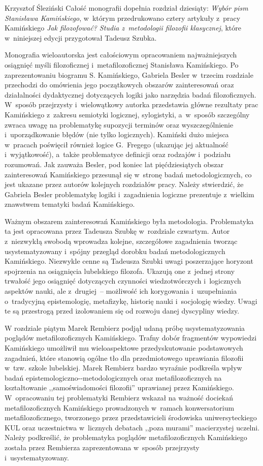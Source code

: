 \begin{recplenv}{Krzysztof Śleziński}
Całość monografii dopełnia rozdział dziesiąty: \textit{Wybór pism Stanisława Kamińskiego}, w~którym przedrukowano cztery
artykuły z~pracy Kamińskiego \textit{Jak filozofować? Studia z~metodologii filozofii klasycznej}, które w~niniejszej
edycji przygotował Tadeusz Szubka.

Monografia wieloautorska jest całościowym opracowaniem najważniejszych osiągnięć myśli filozoficznej i~metafilozoficznej
Stanisława Kamińskiego. Po zaprezentowaniu biogramu S. Kamińskiego, Gabriela Besler w~trzecim rozdziale przechodzi do
omówienia jego początkowych obszarów zainteresowań oraz działalności dydaktycznej dotyczących logiki jako narzędzia
badań filozoficznych. W~sposób przejrzysty i~wielowątkowy autorka przedstawia główne rezultaty prac
Kamińskiego z~zakresu semiotyki logicznej, sylogistyki, a~w~sposób szczególny zwraca uwagę na problematykę supozycji terminów oraz
wyszczególnienie i~uporządkowanie błędów (nie tylko logicznych). Kamiński dużo miejsca w~pracach poświęcił również
logice G.~Fregego (ukazując jej aktualność i~wyjątkowość), a~także problematyce definicji oraz rodzajów i~podziału
rozumowań. Jak zauważa Besler, pod koniec lat pięćdziesiątych obszar zainteresowań Kamińskiego przesunął się w~stronę
badań metodologicznych, co jest ukazane przez autorów kolejnych rozdziałów pracy. Należy stwierdzić, że Gabriela Besler
problematykę logiki i~zagadnienia logiczne prezentuje z~wielkim znawstwem tematyki badań Kamińskiego. 

Ważnym obszarem zainteresowań Kamińskiego była metodologia. Problematyka ta jest opracowana przez Tadeusza
Szubkę w~rozdziale czwartym. Autor z~niezwykłą swobodą wprowadza kolejne, szczegółowe zagadnienia tworząc
usystematyzowany i~spójny przegląd dorobku badań metodologicznych Kamińskiego. Niezwykle cenne są Tadeusza Szubki
uwagi poszerzające
horyzont spojrzenia na osiągnięcia lubelskiego filozofa. Ukazują one z~jednej strony trwałość jego osiągnięć
dotyczących czynności wiedzotwórczych i~logicznych aspektów nauki, ale z~drugiej~-- możliwość ich
korygowania i~uzupełniania o~tradycyjną epistemologię, metafizykę, historię nauki i~socjologię wiedzy.
Uwagi te są przestrogą przed
izolowaniem się od rozwoju danej dyscypliny wiedzy.

W rozdziale piątym Marek Rembierz podjął udaną próbę usystematyzowania poglądów metafilozoficznych Kamińskiego. Trafny
dobór fragmentów wypowiedzi Kamińskiego umożliwił mu wieloaspektowe przedyskutowanie podstawowych zagadnień, które
stanowią ogólne tło dla przedmiotowego uprawiania filozofii w~tzw. szkole lubelskiej. Marek Rembierz bardzo wyraźnie
podkreśla wpływ badań
epistemologiczno-\mbox{-metodologicznych} %
oraz metafilozoficznych na kształtowanie ,,samoświadomości
filozofii'' uprawianej przez Kamińskiego. W~opracowaniu tej problematyki Rembierz wskazał na ważność dociekań
metafilozoficznych Kamińskiego prowadzonych w~ramach konwersatorium metafilozoficznego, tworzonego przez
przedstawicieli środowiska uniwersyteckiego KUL oraz uczestnictwa w~licznych debatach ,,poza murami'' macierzystej
uczelni. Należy podkreślić, że problematyka poglądów metafilozoficznych Kamińskiego została przez Rembierza
zaprezentowana w~sposób przejrzysty i~usystematyzowany.


\end{recplenv}
